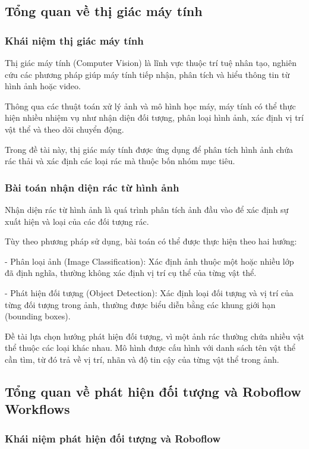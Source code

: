 \documentclass[a4paper,13pt]{extarticle}
\begin{document}
\subsection{Tổng quan về thị giác máy tính}

\subsubsection{Khái niệm thị giác máy tính}
Thị giác máy tính (Computer Vision) là lĩnh vực thuộc trí tuệ nhân tạo, nghiên cứu các phương pháp giúp máy tính tiếp nhận, phân tích và hiểu thông tin từ hình ảnh hoặc video.

Thông qua các thuật toán xử lý ảnh và mô hình học máy, máy tính có thể thực hiện nhiều nhiệm vụ như nhận diện đối tượng, phân loại hình ảnh, xác định vị trí vật thể và theo dõi chuyển động.

Trong đề tài này, thị giác máy tính được ứng dụng để phân tích hình ảnh chứa rác thải và xác định các loại rác mà thuộc bốn nhóm mục tiêu.

\subsubsection{Bài toán nhận diện rác từ hình ảnh}
Nhận diện rác từ hình ảnh là quá trình phân tích ảnh đầu vào để xác định sự xuất hiện và loại của các đối tượng rác.

Tùy theo phương pháp sử dụng, bài toán có thể được thực hiện theo hai hướng:
    
    - {Phân loại ảnh (Image Classification):} Xác định ảnh thuộc một hoặc nhiều lớp đã định nghĩa, thường không xác định vị trí cụ thể của từng vật thể.
   
    - {Phát hiện đối tượng (Object Detection):} Xác định loại đối tượng và vị trí của từng đối tượng trong ảnh, thường được biểu diễn bằng các khung giới hạn (bounding boxes).

Đề tài lựa chọn hướng phát hiện đối tượng, vì một ảnh rác thường chứa nhiều vật thể thuộc các loại khác nhau. Mô hình được cấu hình với danh sách tên vật thể cần tìm, từ đó trả về vị trí, nhãn và độ tin cậy của từng vật thể trong ảnh.

\subsection{Tổng quan về phát hiện đối tượng và Roboflow Workflows}

\subsubsection{Khái niệm phát hiện đối tượng và Roboflow}
\end{document}
